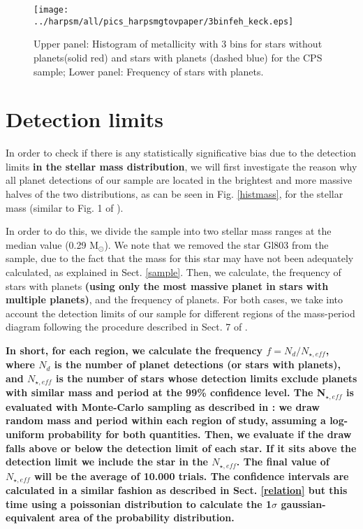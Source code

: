 \documentclass[structabstract]{aa}
\begin{document}
\begin{figure}[h]
\begin{center}
\texttt{[image: ../harpsm/all/pics\_harpsmgtovpaper/3binfeh\_keck.eps]}
\end{center}
\caption{Upper panel: Histogram of metallicity with 3 bins for stars without planets(solid red) and stars with planets (dashed blue) for the CPS sample; Lower panel: Frequency of stars with planets.}
\label{3feh:keck}
\end{figure}



\section{Detection limits}
\label{dl}

In order to check if there is any statistically significative bias due to the detection limits \textbf{in the stellar mass distribution}, we will first investigate the reason why all planet detections of our sample are located in the brightest and more massive halves of the two distributions, as can be seen in Fig. \ref{histmass}, for the stellar mass (similar to Fig. 1 of \citet{Bonfils-2011}).

In order to do this, we divide the sample into two stellar mass ranges at the median value (0.29 M$_{\odot}$). We note that we removed the star Gl803 from the sample, due to the fact that the mass for this star may have not been adequately calculated, as explained in Sect. \ref{sample}. Then, we calculate, the frequency of stars with planets \textbf{(using only the most massive planet in stars with multiple planets)}, and the frequency of planets. For both cases, we take into account the detection limits of our sample for different regions of the mass-period diagram following the procedure described in Sect. 7 of \citet{Bonfils-2011}. 

\textbf{In short, for each region, we calculate the frequency $f=N_{d}/N_{\star,eff}$, where $N_{d}$ is the number of planet detections (or stars with planets), and $N_{\star,eff}$ is the number of stars whose detection limits exclude planets with similar mass and period at the 99\% confidence level. The N$_{\star,eff}$ is evaluated with Monte-Carlo sampling as described in \citet{Bonfils-2011}: we draw random mass and period within each region of study, assuming a log-uniform probability for both quantities. Then, we evaluate if the draw falls above or below the detection limit of each star. If it sits above the detection limit we include the star in the $N_{\star,eff}$. The final value of $N_{\star,eff}$ will be the average of 10.000 trials. The confidence intervals are calculated in a similar fashion as described in Sect. \ref{relation} but this time using a poissonian distribution to calculate the 1$\sigma$ gaussian-equivalent area of the probability distribution.}%
\end{document}
